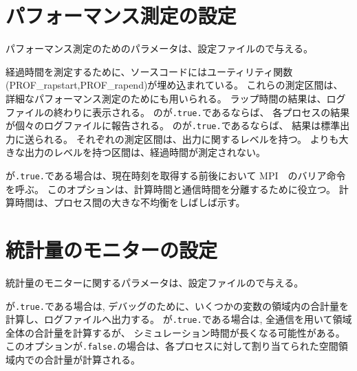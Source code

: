 \section{パフォーマンス測定の設定} \label{subsec:prof}

パフォーマンス測定のためのパラメータは、設定ファイルので与える。


\noindent
経過時間を測定するために、ソースコードにはユーティリティ関数(PROF\_rapstart,PROF\_rapend)が埋め込まれている。
これらの測定区間は、詳細なパフォーマンス測定のためにも用いられる。
%
ラップ時間の結果は、ログファイルの終わりに表示される。
のが\verb|.true.|であるならば、
各プロセスの結果が個々のログファイルに報告される。
のが\verb|.true.|であるならば、
結果は標準出力に送られる。
%
それぞれの測定区間は、出力に関するレベルを持つ。
よりも大きな出力のレベルを持つ区間は、経過時間が測定されない。

が\verb|.true.|である場合は、現在時刻を取得する前後において MPI　のバリア命令を呼ぶ。
このオプションは、計算時間と通信時間を分離するために役立つ。
計算時間は、プロセス間の大きな不均衡をしばしば示す。


\section{統計量のモニターの設定} \label{subsec:statistics}

統計量のモニターに関するパラメータは、設定ファイルので与える。


\noindent
{}が\verb|.true.|である場合は, 
デバッグのために、いくつかの変数の領域内の合計量を計算し、ログファイルへ出力する。
%
が\verb|.true.|である場合は, 
全通信を用いて領域全体の合計量を計算するが、
シミュレーション時間が長くなる可能性がある。
このオプションが\verb|.false.|の場合は、各プロセスに対して割り当てられた空間領域内での合計量が計算される。


